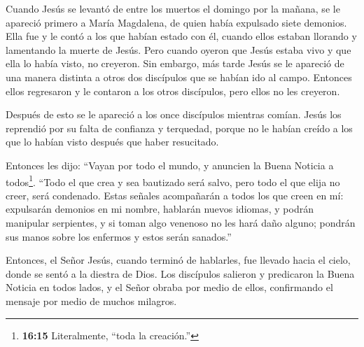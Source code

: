  Cuando Jesús se levantó de entre los muertos el domingo por
la mañana, se le apareció primero a María Magdalena, de quien había
expulsado siete demonios.  Ella fue y le contó a los que
habían estado con él, cuando ellos estaban llorando y lamentando la
muerte de Jesús.  Pero cuando oyeron que Jesús estaba vivo
y que ella lo había visto, no creyeron.  Sin embargo, más
tarde Jesús se le apareció de una manera distinta a otros dos discípulos
que se habían ido al campo.  Entonces ellos regresaron y le
contaron a los otros discípulos, pero ellos no les creyeron.

 Después de esto se le apareció a los once discípulos
mientras comían. Jesús los reprendió por su falta de confianza y
terquedad, porque no le habían creído a los que lo habían visto después
que haber resucitado.

 Entonces les dijo: ``Vayan por todo el mundo, y anuncien
la Buena Noticia a todos\footnote{\textbf{16:15} Literalmente, ``toda la
  creación.''}.  ``Todo el que crea y sea bautizado será
salvo, pero todo el que elija no creer, será condenado. 
Estas señales acompañarán a todos los que creen en mí: expulsarán
demonios en mi nombre, hablarán nuevos idiomas,  y podrán
manipular serpientes, y si toman algo venenoso no les hará daño alguno;
pondrán sus manos sobre los enfermos y estos serán sanados.''

 Entonces, el Señor Jesús, cuando terminó de hablarles, fue
llevado hacia el cielo, donde se sentó a la diestra de Dios.
 Los discípulos salieron y predicaron la Buena Noticia en
todos lados, y el Señor obraba por medio de ellos, confirmando el
mensaje por medio de muchos milagros.
